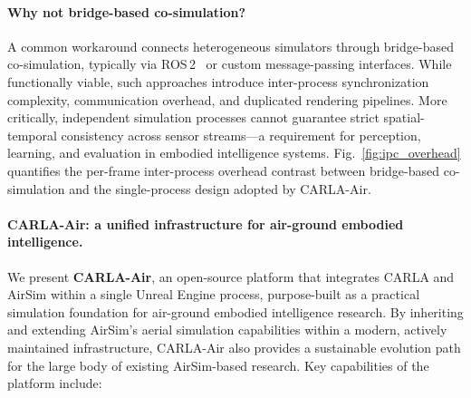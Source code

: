 \paragraph{Why not bridge-based co-simulation?}
A common workaround connects heterogeneous simulators through bridge-based
co-simulation, typically via ROS\,2~\cite{ros2} or custom message-passing
interfaces.
While functionally viable, such approaches introduce inter-process
synchronization complexity, communication overhead, and duplicated rendering
pipelines.
More critically, independent simulation processes cannot guarantee strict
spatial-temporal consistency across sensor streams---a requirement for
perception, learning, and evaluation in embodied intelligence systems.
Fig.~\ref{fig:ipc_overhead} quantifies the per-frame inter-process overhead
contrast between bridge-based co-simulation and the single-process design
adopted by CARLA-Air.



\paragraph{CARLA-Air: a unified infrastructure for air-ground embodied intelligence.}
We present \textbf{CARLA-Air}, an open-source platform that integrates CARLA
and AirSim within a single Unreal Engine process, purpose-built as a practical
simulation foundation for air-ground embodied intelligence research.
By inheriting and extending AirSim's aerial simulation capabilities within a
modern, actively maintained infrastructure, CARLA-Air also provides a
sustainable evolution path for the large body of existing AirSim-based research.
Key capabilities of the platform include:


